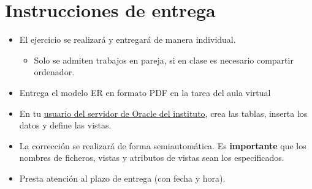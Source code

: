 \documentclass[a4paper]{article}
\begin{document}
\section{Instrucciones de entrega}
\label{sec:org000000f}
\begin{itemize}
\item El ejercicio se realizará y entregará de manera individual.
\begin{itemize}
\item Solo se admiten trabajos en pareja, si en clase es necesario compartir ordenador.
\end{itemize}
\item Entrega el modelo ER en formato PDF en la tarea del aula virtual
\item En tu \href{https://aulavirtual3.educa.madrid.org/ies.alonsodeavellan.alcala/mod/assign/view.php?id=29534}{usuario del servidor de Oracle del instituto}, crea las tablas, inserta los datos y define las vistas.
\item La corrección se realizará de forma semiautomática. Es \textbf{importante} que los nombres de ficheros, vistas y atributos de vistas sean los especificados.
\item Presta atención al plazo de entrega (con fecha y hora).
\end{itemize}
\end{document}

